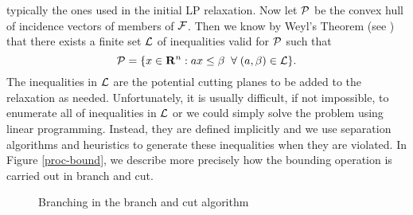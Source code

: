 typically the ones used in the initial LP relaxation. Now let ${\cal
P}$ be the convex hull of incidence vectors of members of ${\cal
F}$. Then we know by Weyl's Theorem (see \cite{nemwol88}) that there exists
a finite set ${\cal L}$ of inequalities valid for ${\cal P}$ such that
\begin{equation}
\label{the-polyhedron}
{\cal P} = \{x \in {\bf R}^n: ax \leq \beta\;\;\forall\;(a, \beta) \in 
{\cal L}\}.
\end{equation}
The inequalities in ${\cal L}$ are the potential cutting planes to be
added to the relaxation as needed. Unfortunately, it is usually
difficult, if not impossible, to enumerate all of inequalities in
${\cal L}$ or we could simply solve the problem using linear
programming. Instead, they are defined implicitly and we use
separation algorithms and heuristics to generate these inequalities
when they are violated. In Figure \ref{proc-bound}, we describe more
precisely how the bounding operation is carried out in branch and cut.
\begin{figure}
\caption{Branching in the branch and cut algorithm}
\label{branching-fig}
\end{figure}

